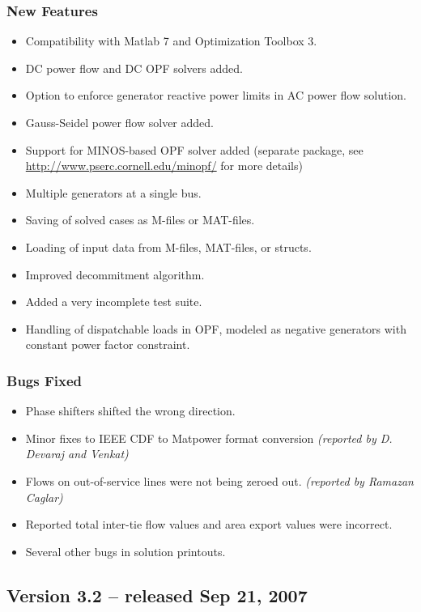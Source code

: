\documentclass[12pt]{article}
\newcommand{\matlab}[0]{{\sc Matlab}}
\newcommand{\matpower}[0]{{\sc Matpower}}
\newcommand{\ot}[0]{{Optimization Toolbox}}
\numberwithin{equation}{section}
\numberwithin{table}{section}
\numberwithin{figure}{section}
\begin{document}
\begin{appendices}
\subsubsection*{New Features}
\begin{itemize}
\item Compatibility with \matlab{} 7 and \ot{} 3.
\item DC power flow and DC OPF solvers added.
\item Option to enforce generator reactive power limits in AC power flow solution.
\item Gauss-Seidel power flow solver added.
\item Support for MINOS-based OPF solver added (separate package, see \\ \url{http://www.pserc.cornell.edu/minopf/} for more details)
\item Multiple generators at a single bus.
\item Saving of solved cases as M-files or MAT-files.
\item Loading of input data from M-files, MAT-files, or structs.
\item Improved decommitment algorithm.
\item Added a very incomplete test suite.
\item Handling of dispatchable loads in OPF, modeled as negative generators with constant power factor constraint.
\end{itemize}

\subsubsection*{Bugs Fixed}
\begin{itemize}
\item Phase shifters shifted the wrong direction.
\item Minor fixes to IEEE CDF to \matpower{} format conversion \emph{(reported by D. Devaraj and Venkat)}
\item Flows on out-of-service lines were not being zeroed out. \emph{(reported by Ramazan Caglar)}
\item Reported total inter-tie flow values and area export values were incorrect.
\item Several other bugs in solution printouts.
\end{itemize}


\subsection{Version 3.2 -- released Sep 21, 2007}
\label{app:v32}


\end{appendices}
\end{document}
